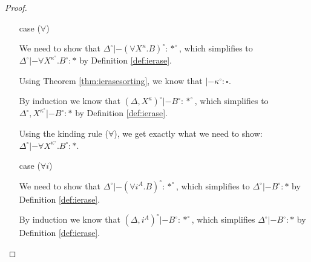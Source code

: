 \begin{proof}
\begin{itemize}
\item[case] ($\forall$)

	We need to show that
	$\Delta^\circ |- (\forall X^\kappa.B)^\circ : *^\circ$,
	which simplifies to
	$\Delta^\circ |- \forall X^{\kappa^\circ}.B^\circ : *$
	by Definition \ref{def:ierase}.

	Using Theorem \ref{thm:ierasesorting}, we know that
	$|- \kappa^\circ : \square$.

	By induction we know that
	$(\Delta,X^\kappa)^\circ |- B^\circ : *^\circ$,
	which simplifies to
	$\Delta^\circ,X^{\kappa^\circ} |- B^\circ : *$
	by Definition \ref{def:ierase}.

	Using the kinding rule ($\forall$), we get exactly
	what we need to show:
	$\Delta^\circ |- \forall X^{\kappa^\circ}.B^\circ : *$.

\item[case] ($\forall i$)

	We need to show that
	$\Delta^\circ |- (\forall i^A.B)^\circ : *^\circ$,
	which simplifies to $\Delta^\circ |- B^\circ : *$
	by Definition \ref{def:ierase}.

	By induction we know that
	$(\Delta,i^A)^\circ |- B^\circ : *^\circ$,
	which simplifies $\Delta^\circ |- B^\circ : *$
	by Definition \ref{def:ierase}.\qedhere
\end{itemize}
\end{proof}

